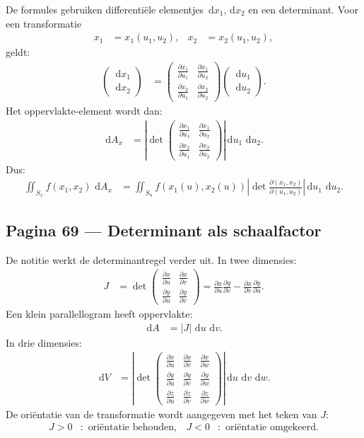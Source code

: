 \documentclass[11pt]{article}
\newcommand{\dd}{\,\mathrm{d}}
\newcommand{\pd}[2]{\frac{\partial #1}{\partial #2}}
\begin{document}
De formules gebruiken differentiële elementjes $\dd x_1,\dd x_2$ en een determinant. Voor een transformatie
\begin{align*}
x_1&=x_1(u_1,u_2),
&
x_2&=x_2(u_1,u_2),
\end{align*}
geldt:
\begin{align*}
\begin{pmatrix}
\dd x_1\\
\dd x_2
\end{pmatrix}
&=
\begin{pmatrix}
\pd{x_1}{u_1} & \pd{x_1}{u_2}\\
\pd{x_2}{u_1} & \pd{x_2}{u_2}
\end{pmatrix}
\begin{pmatrix}
\dd u_1\\
\dd u_2
\end{pmatrix}.
\end{align*}
Het oppervlakte-element wordt dan:
\begin{align*}
\dd A_x
&=
\left|
\det
\begin{pmatrix}
\pd{x_1}{u_1} & \pd{x_1}{u_2}\\
\pd{x_2}{u_1} & \pd{x_2}{u_2}
\end{pmatrix}
\right|
\dd u_1\,\dd u_2.
\end{align*}
Dus:
\begin{align*}
\iint_{S_x} f(x_1,x_2)\,\dd A_x
&=
\iint_{S_u}
f(x_1(u),x_2(u))
\left|\det\pd{(x_1,x_2)}{(u_1,u_2)}\right|
\dd u_1\,\dd u_2.
\end{align*}

\subsection*{Pagina 69 --- Determinant als schaalfactor}

De notitie werkt de determinantregel verder uit. In twee dimensies:
\begin{align*}
J
&=
\det
\begin{pmatrix}
\pd{x}{u} & \pd{x}{v}\\
\pd{y}{u} & \pd{y}{v}
\end{pmatrix}
=
\pd{x}{u}\pd{y}{v}
-
\pd{x}{v}\pd{y}{u}.
\end{align*}
Een klein parallellogram heeft oppervlakte:
\begin{align*}
\dd A
&=
|J|\,\dd u\,\dd v.
\end{align*}
In drie dimensies:
\begin{align*}
\dd V
&=
\left|
\det
\begin{pmatrix}
\pd{x}{u} & \pd{x}{v} & \pd{x}{w}\\
\pd{y}{u} & \pd{y}{v} & \pd{y}{w}\\
\pd{z}{u} & \pd{z}{v} & \pd{z}{w}
\end{pmatrix}
\right|
\dd u\,\dd v\,\dd w.
\end{align*}
De oriëntatie van de transformatie wordt aangegeven met het teken van $J$:
\begin{align*}
J>0&:\text{ oriëntatie behouden},
&
J<0&:\text{ oriëntatie omgekeerd}.
\end{align*}
\end{document}
